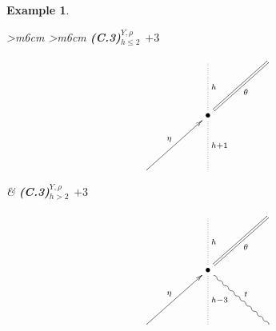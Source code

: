 \documentclass[english,letter paper,12pt,leqno]{article}
\theoremstyle{example}
\newtheorem{example}[theorem]{Example}
\numberwithin{equation}{section}
\begin{document}
\begin{example}
\begin{center}
\begin{tabular}{ >{\centering}m{6cm} >{\centering}m{6cm} }
\textbf{(C.3)${}^{Y,\rho}_{h \le 2}$ $+3$}
\vspace{0.1cm}
\[
\xymatrix@C+2pc@R+1.5pc{
& \ar@{.}[d]^-{h} & \ar@{=}[dl]^-{\theta} \\
& \bullet \ar@{.}[d]^-{h+1}\\
\ar[ur]^-{\eta} & &
}
\]
&
\textbf{(C.3)${}^{Y,\rho}_{h > 2}$ $+3$}
\vspace{0.1cm}
\[
\xymatrix@C+2pc@R+1.5pc{
& \ar@{.}[d]^-{h} & \ar@{=}[dl]^-{\theta} \\
& \bullet \ar@{.}[d]^-{h-3} \ar@{~}[dr]^-{t}\\
\ar[ur]^-{\eta} & &
}
\]
\end{tabular}
\end{center}


\end{example}
\end{document}
